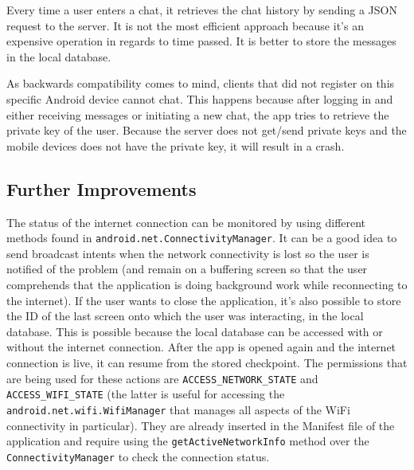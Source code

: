 Every time a user enters a chat, it retrieves the chat history by sending a JSON request to the server. It is not the most efficient approach because it's an expensive operation in regards to time passed. It is better to store the messages in the local database.

As backwards compatibility comes to mind, clients that did not register on this specific Android device cannot chat. This happens because after logging in and either receiving messages or initiating a new chat, the app tries to retrieve the private key of the user. Because the server does not get/send private keys and the mobile devices does not have the private key, it will result in a crash.


\subsection{Further Improvements}

The status of the internet connection can be monitored by using different methods found in \verb|android.net.ConnectivityManager|. It can be a good idea to send broadcast intents when the network connectivity is lost so the user is notified of the problem (and remain on a buffering screen so that the user comprehends that the application is doing background work while reconnecting to the internet). If the user wants to close the application, it's also possible to store the ID of the last screen onto which the user was interacting, in the local database. This is possible because the local database can be accessed with or without the internet connection. After the app is opened again and the internet connection is live, it can resume from the stored checkpoint. The permissions that are being used for these actions are \verb|ACCESS_NETWORK_STATE| and \verb|ACCESS_WIFI_STATE| (the latter is useful for accessing the \verb|android.net.wifi.WifiManager| that manages all aspects of the WiFi connectivity in particular). They are already inserted in the Manifest file of the application and require using the \verb|getActiveNetworkInfo| method over the \verb|ConnectivityManager| to check the connection status.

